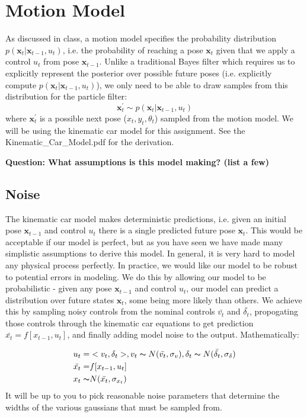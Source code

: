 \documentclass[final]{article}
\begin{document}
\section{ Motion Model}
As discussed in class, a motion model specifies the probability distribution $p(\mathbf{x}_t | \mathbf{x}_{t-1}, u_t)$, i.e. the probability of reaching a pose $\mathbf{x}_t$ given that we apply a control $u_t$ from pose $\mathbf{x}_{t-1}$. Unlike a traditional Bayes filter which requires us to explicitly represent the posterior over possible future poses (i.e. explicitly compute $p(\mathbf{x}_t | \mathbf{x}_{t-1}, u_t)$),  we only need to be able to draw samples from this distribution for the particle filter:
\begin{equation}
\mathbf{x}^\prime_t \sim p(\mathbf{x}_t | \mathbf{x}_{t-1}, u_t) 
\end{equation}
where $\mathbf{x}^\prime_t$ is a possible next pose ($x_t,y_t,\theta_t$) sampled from the motion model. We will be using the kinematic car model for this assignment. See the Kinematic\_Car\_Model.pdf for the derivation.

\textbf{Question: What assumptions is this model making? (list a few)}

\subsection{Noise}
The kinematic car model makes deterministic predictions, i.e. given an initial pose $\mathbf{x}_{t-1}$ and control $u_t$ there is a single predicted future pose $\mathbf{x}_t$. This would be acceptable if our model is perfect, but as you have seen we have made many simplistic assumptions to derive this model. In general, it is very hard to model any physical process perfectly. In practice, we would like our model to be robust to  potential errors in modeling. We do this by allowing our model to be probabilistic - given any pose $\mathbf{x}_{t-1}$ and control $u_t$, our model can predict a distribution over future states $\mathbf{x}_t$, some being more likely than others. We achieve this by sampling noisy controls from the nominal controls $\bar{v_t}$ and $\bar{\delta_t}$, propogating those controls through the kinematic car equations to get prediction $\bar{x_t} = f[x_{t-1},u_t]$, and finally adding model noise to the output. Mathematically: 

\begin{align*}
u_t =& <v_t, \delta_t>, v_t \thicksim N(\bar{v_t},\sigma_v), \delta_t \thicksim N(\bar{\delta_t}, \sigma_{\delta}) \\
\bar{x_t} =& f[x_{t-1},u_t] \\
x_t \thicksim & N(\bar{x_t}, \sigma_{x_t})
\end{align*}
It will be up to you to pick reasonable noise parameters that determine the widths of the various gaussians that must be sampled from.
\end{document}
